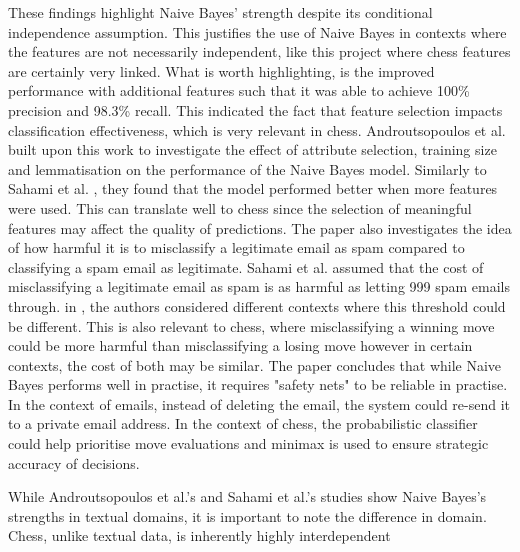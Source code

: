 These findings highlight Naive Bayes' strength despite its conditional independence assumption. This justifies the use of Naive Bayes in contexts where the features are not necessarily independent, like this project where chess features are certainly very linked. What is worth highlighting, is the improved performance with additional features such that it was able to achieve 100\% precision and 98.3\% recall. This indicated the fact that feature selection impacts classification effectiveness, which is very relevant in chess. Androutsopoulos et al. \cite{androutsopoulosEvaluationNaiveBayesian2000} built upon this work to investigate the effect of attribute selection, training size and lemmatisation on the performance of the Naive Bayes model. Similarly to Sahami et al. \cite{sahamiBayesianApproachFiltering} , they found that the model performed better when more features were used. This can translate well to chess since the selection of meaningful features may affect the quality of predictions. The paper also investigates the idea of how harmful it is to misclassify a legitimate email as spam compared to classifying a spam email as legitimate. Sahami et al. assumed that the cost of misclassifying a legitimate email as spam is as harmful as letting 999 spam emails through. in \cite{androutsopoulosEvaluationNaiveBayesian2000}, the authors considered different contexts where this threshold could be different. This is also relevant to chess, where misclassifying a winning move could be more harmful than misclassifying a losing move however in certain contexts, the cost of both may be similar. The paper concludes that while Naive Bayes performs well in practise, it requires "safety nets" to be reliable in practise. In the context of emails, instead of deleting the email, the system could re-send it to a private email address. In the context of chess, the probabilistic classifier could help prioritise move evaluations and minimax is used to ensure strategic accuracy of decisions. 

While Androutsopoulos et al.'s and Sahami et al.'s studies show Naive Bayes's strengths in textual domains, it is important to note the difference in domain. Chess, unlike textual data, is inherently highly interdependent 

